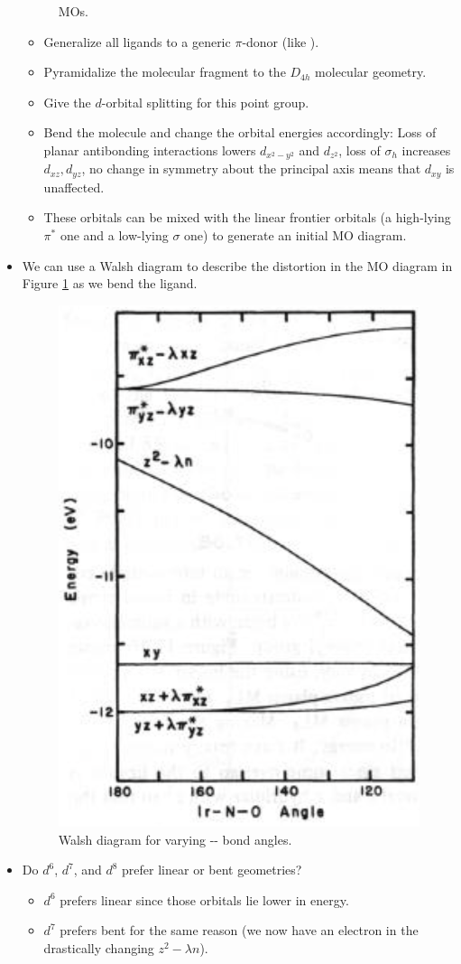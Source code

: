 \documentclass[../notes.tex]{subfiles}
\begin{document}
\begin{itemize}
\begin{figure}[h!]
        \caption{ MOs.}
        \label{fig:MOsNOcomplex}
    \end{figure}
    \begin{itemize}
        \item Generalize all ligands to a generic $\pi$-donor (like ).
        \item Pyramidalize the molecular fragment to the $D_{4h}$ molecular geometry.
        \item Give the $d$-orbital splitting for this point group.
        \item Bend the molecule and change the orbital energies accordingly: Loss of planar antibonding interactions lowers $d_{x^2-y^2}$ and $d_{z^2}$, loss of $\sigma_h$ increases $d_{xz},d_{yz}$, no change in symmetry about the principal axis means that $d_{xy}$ is unaffected.
        \item These orbitals can be mixed with the linear  frontier orbitals (a high-lying $\pi^*$ one and a low-lying $\sigma$ one) to generate an initial MO diagram.
    \end{itemize}
    \item We can use a Walsh diagram to describe the distortion in the MO diagram in Figure \ref{fig:MOsNOcomplex} as we bend the  ligand.
    \begin{figure}[h!]
        \centering
        \includegraphics[width=0.23\linewidth]{../ExtFiles/WalshNOcomplex.png}
        \caption{Walsh diagram for varying -- bond angles.}
        \label{fig:WalshNOcomplex}
    \end{figure}
    \item Do $d^6$, $d^7$, and $d^8$ prefer linear or bent geometries?
    \begin{itemize}
        \item $d^6$ prefers linear since those orbitals lie lower in energy.
        \item $d^7$ prefers bent for the same reason (we now have an electron in the drastically changing $z^2-\lambda n$).

\end{itemize}
\end{itemize}
\end{document}
